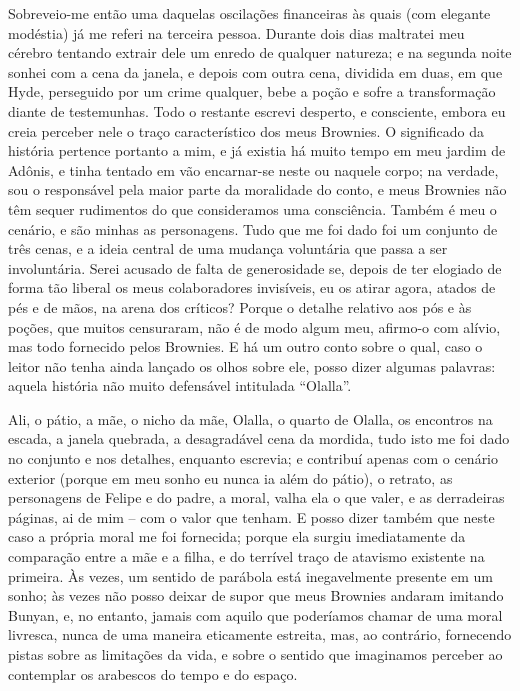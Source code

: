 Sobreveio-me então uma daquelas oscilações financeiras às quais (com
elegante modéstia) já me referi na terceira pessoa.  Durante dois dias
maltratei meu cérebro tentando extrair dele um enredo de qualquer
natureza; e na segunda noite sonhei com a cena da janela, e depois com
outra cena, dividida em duas, em que Hyde, perseguido por um crime
qualquer, bebe a poção e sofre a transformação diante de testemunhas. 
Todo o restante escrevi desperto, e consciente, embora eu creia 
perceber nele o traço característico dos meus Brownies.  O
significado da história pertence portanto a mim, e já existia há muito
tempo em meu jardim de Adônis, e tinha tentado em vão encarnar-se neste
ou naquele corpo; na verdade, sou o responsável pela maior parte da
moralidade do conto, e meus Brownies não têm sequer rudimentos do que
consideramos uma consciência.  Também é meu o cenário, e são minhas as
personagens.  Tudo que me foi dado foi um conjunto de três cenas, e a
ideia central de uma mudança voluntária que passa a ser involuntária. 
Serei acusado de falta de generosidade se, depois de ter elogiado de
forma tão liberal os meus colaboradores invisíveis, eu os atirar agora,
atados de pés e de mãos, na arena dos críticos?  Porque o detalhe
relativo aos pós e às poções, que muitos censuraram, não é de modo
algum meu, afirmo-o com alívio, mas todo fornecido pelos Brownies.  E
há um outro conto sobre o qual, caso o leitor não tenha ainda lançado
os olhos sobre ele, posso dizer algumas palavras: aquela história não
muito defensável intitulada “Olalla”.

Ali, o pátio, a mãe, o nicho da mãe, Olalla, o quarto de Olalla, os
encontros na escada, a janela quebrada, a desagradável cena da mordida,
tudo isto me foi dado no conjunto e nos detalhes, enquanto escrevia; e
contribuí apenas com o cenário exterior (porque em meu sonho eu nunca
ia além do pátio), o retrato, as personagens de Felipe e do padre, a
moral, valha ela o que valer, e as derradeiras páginas, ai de mim -- com
o valor que tenham.  E posso dizer também que neste caso a própria
moral me foi fornecida; porque ela surgiu imediatamente da comparação
entre a mãe e a filha, e do terrível traço de atavismo existente na
primeira.  Às vezes, um sentido de parábola está inegavelmente presente
em um sonho; às vezes não posso deixar de supor que meus Brownies
andaram imitando Bunyan, e, no entanto, jamais com aquilo que
poderíamos chamar de uma moral livresca, nunca de uma maneira
eticamente estreita, mas, ao contrário, fornecendo pistas sobre as
limitações da vida, e sobre o sentido que imaginamos perceber ao
contemplar os arabescos do tempo e do espaço.

